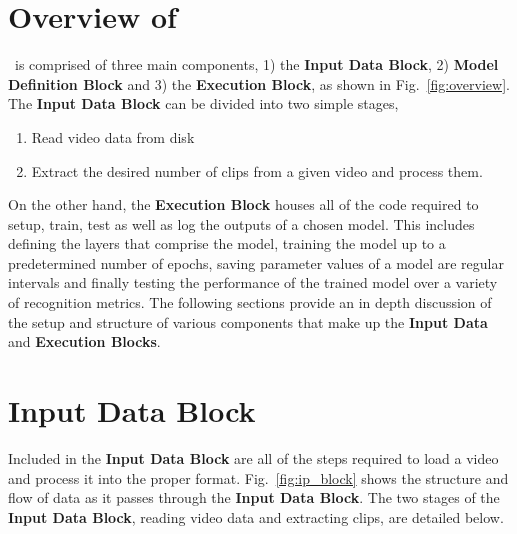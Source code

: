 \documentclass{llncs}
\begin{document}
\section{Overview of \acro}
\label{sec:overview}

\acro~is comprised of three main components, 1) the \textbf{Input Data Block}, 2) \textbf{Model Definition Block} and 3) the \textbf{Execution Block}, as shown in Fig.~\ref{fig:overview}.
The \textbf{Input Data Block} can be divided into two simple stages,
\begin{enumerate}
\item Read video data from disk
\item Extract the desired number of clips from a given video and process them.
\end{enumerate}
On the other hand, the \textbf{Execution Block} houses all of the code required to setup, train, test as well as log the outputs of a chosen model.
This includes defining the layers that comprise the model, training the model up to a predetermined number of epochs, saving parameter values of a model are regular intervals and finally testing the performance of the trained model over a variety of recognition metrics.
The following sections provide an in depth discussion of the setup and structure of various components that make up the \textbf{Input Data} and \textbf{Execution Blocks}.

\section{Input Data Block}
\label{sec:ipblock}
Included in the \textbf{Input Data Block} are all of the steps required to load a video and process it into the proper format.
Fig.~\ref{fig:ip_block} shows the structure and flow of data as it passes through the \textbf{Input Data Block}.
The two stages of the \textbf{Input Data Block}, reading video data and extracting clips, are detailed below.
\end{document}

